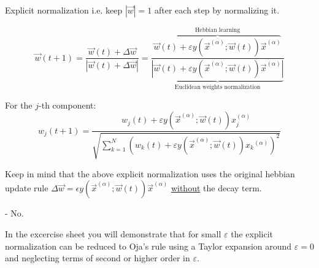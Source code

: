 \begin{frame}{\subsubsecname}

\begin{block}{Explicit normalization} 
i.e. keep $|\vec w| = 1$ after each step by normalizing it.

\begin{equation}
	\vec{w}(t+1) = 
    \frac{\vec w(t) + \Delta \vec w}{|\vec w(t) + \Delta \vec w|} 
    = \frac
    {\overbrace{\vec{w}(t) + \varepsilon y(\vec{x}^{(\alpha)}; \vec{w}(t)) \vec{x}^{(\alpha)}}^{\text{Hebbian learning}}}
    {\underbrace{\left| \vec{w}(t) + \varepsilon y(\vec{x}^{(\alpha)}; \vec{w}(t)) \vec{x}^{(\alpha)} \right|}_{\text{Euclidean weights normalization}}}
\end{equation}

For the $j$-th component:\\
\begin{equation*}
    w_j(t+1) = \frac
    {w_j(t) + \varepsilon y(\vec{x}^{(\alpha)}; \vec{w}(t)) x_j^{(\alpha)}}
    {\sqrt{ \sum_{k=1}^{N} \left( w_k(t) + \varepsilon y(\vec{x}^{(\alpha)}; \vec{w}(t)) {x_k}^{(\alpha)} \right)^2}}
\end{equation*}
\end{block}

Keep in mind that the above explicit normalization uses the original hebbian update rule 
$\Delta \vec w = \epsilon y(\vec x^ {(\alpha)}; \vec w(t)) \vec x^{(\alpha)}$ \underline{without} the decay term.\\
\end{frame}

\begin{frame}


- No.\\

\pause

In the excercise sheet you will demonstrate that for small $\varepsilon$ the explicit normalization can be reduced to Oja's rule using a Taylor expansion around $\varepsilon = 0$ and neglecting terms of second or higher order in $\varepsilon$. 

\end{frame}
